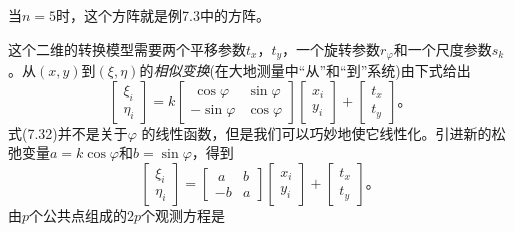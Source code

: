 当$n = 5$时，这个方阵就是例7.3中的方阵。
\par
这个二维的转换模型需要两个平移参数$t_x$，$ t_y$，一个旋转参数$r_\varphi$和一个尺度参数$s_k$。从$(x , y)$到$(\xi, \eta)$的\emph{相似变换}(在大地测量中“从”和“到”系统)由下式给出
\begin{equation}
	\begin{bmatrix}
		\xi_{i}\\
		\eta_{i}
	\end{bmatrix}
	= k
	\begin{bmatrix}
		\ \cos\varphi & \sin \varphi\\
		-\sin \varphi & \cos \varphi
	\end{bmatrix}
	\begin{bmatrix}
		x_i\\
		y_i
	\end{bmatrix}
	+   \begin{bmatrix}
		t_x\\
		t_y
	\end{bmatrix}\text{。}
\end{equation}
式(7.32)并不是关于$\varphi$ 的线性函数，但是我们可以巧妙地使它线性化。引进新的松弛变量$a = k \cos \varphi$和$b = \sin \varphi$，得到
\begin{equation}
	\begin{bmatrix}
		\xi_{i}\\
		\eta_{i}
	\end{bmatrix}
	=
	\begin{bmatrix}
		\ a & b\\
		-b & a
	\end{bmatrix}
	\begin{bmatrix}
		x_i\\
		y_i
	\end{bmatrix}
	+   \begin{bmatrix}
		t_x\\
		t_y
	\end{bmatrix}\text{。}
\end{equation}
由$p$个公共点组成的$2p$个观测方程是
